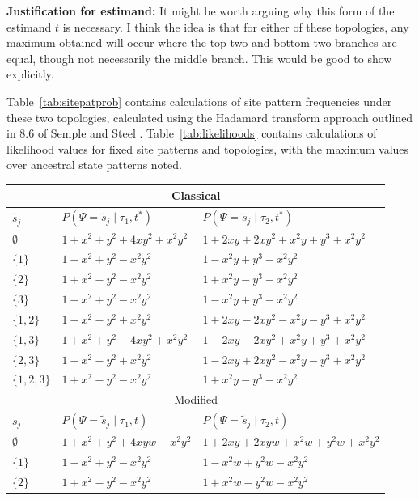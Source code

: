 \documentclass[a4paper]{article}
\newcommand{\siteSplit}{\tilde{s}}
\newcommand{\siteSplitRV}{\Psi}
\begin{document}
\textbf{Justification for estimand:} It might be worth arguing why this form of the estimand $t$ is necessary.
I think the idea is that for either of these topologies, any maximum obtained will occur where the top two and bottom two branches are equal, though not necessarily the middle branch.
This would be good to show explicitly.

Table~\ref{tab:sitepatprob} contains calculations of site pattern frequencies under these two topologies, calculated using the Hadamard transform approach outlined in 8.6 of Semple and Steel \cite{Semple2003-em}.
Table~\ref{tab:likelihoods} contains calculations of likelihood values for fixed site patterns and topologies, with the maximum values over ancestral state patterns noted.

\begin{table}
\centering
\begin{tabular}{|l|l|l|}
\multicolumn{3}{c}{Classical}\\
    \hline
$\siteSplit_j$   &$P(\siteSplitRV=\siteSplit_j \mid \tau_1,t^*)$&$P(\siteSplitRV=\siteSplit_j \mid \tau_2,t^*)$\\
    \hline
    $\emptyset$    &$1+x^2+y^2+4xy^2+x^2y^2$&$1+2xy+2xy^2+x^2y+y^3+x^2y^2$\\
    $\{1\}$        &$1-x^2+y^2-x^2y^2$&$1-x^2y+y^3-x^2y^2$\\
    $\{2\}$        &$1+x^2-y^2-x^2y^2$&$1+x^2y-y^3-x^2y^2$\\
    $\{3\}$        &$1-x^2+y^2-x^2y^2$&$1-x^2y+y^3-x^2y^2$\\
    $\{1,2\}$      &$1-x^2-y^2+x^2y^2$&$1+2xy-2xy^2-x^2y-y^3+x^2y^2$\\
    $\{1,3\}$      &$1+x^2+y^2-4xy^2+x^2y^2$&$1-2xy-2xy^2+x^2y+y^3+x^2y^2$\\
    $\{2,3\}$      &$1-x^2-y^2+x^2y^2$&$1-2xy+2xy^2-x^2y-y^3+x^2y^2$\\
    $\{1,2,3\}$    &$1+x^2-y^2-x^2y^2$&$1+x^2y-y^3-x^2y^2$\\
    \hline
\multicolumn{3}{c}{Modified}\\
    \hline
$\siteSplit_j$   &$P(\siteSplitRV=\siteSplit_j \mid \tau_1,t)$&$P(\siteSplitRV=\siteSplit_j \mid \tau_2,t)$\\
    \hline
    $\emptyset$     &$1+x^2+y^2+4xyw+x^2y^2$&$1+2xy+2xyw+x^2w+y^2w+x^2y^2$\\
    $\{1\}$        &$1-x^2+y^2-x^2y^2$&$1-x^2w+y^2w-x^2y^2$\\
    $\{2\}$        &$1+x^2-y^2-x^2y^2$&$1+x^2w-y^2w-x^2y^2$\\

\end{tabular}
\end{table}
\end{document}
